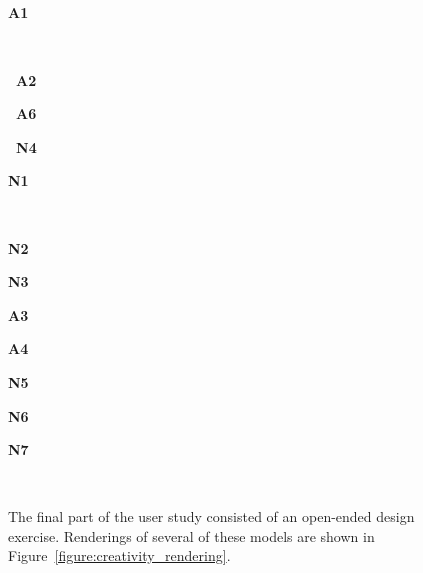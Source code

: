\begin{figure}[t]
\vspace{-2.35in}
\\
\begin{minipage}{1.97in}~\end{minipage}
\begin{minipage}{1.97in}~\end{minipage}
\begin{minipage}{1.97in}~\end{minipage}
\begin{minipage}{0.88in}{\bf A1}\end{minipage}
\vspace{0.85in}
\\
\begin{minipage}{1.97in}{\bf ~A2}\end{minipage}
\begin{minipage}{1.97in}{\bf ~A6}\end{minipage}
\begin{minipage}{1.97in}{\bf ~N4}\end{minipage}
\begin{minipage}{0.88in}{\bf N1}\end{minipage}
\vspace{0.85in}
\\
\begin{minipage}{0.97in}{\bf N2}\end{minipage}
\begin{minipage}{0.97in}{\bf N3}\end{minipage}
\begin{minipage}{0.97in}{\bf A3}\end{minipage}
\begin{minipage}{0.97in}{\bf A4}\end{minipage}
\begin{minipage}{0.97in}{\bf N5}\end{minipage}
\begin{minipage}{0.97in}{\bf N6}\end{minipage}
\begin{minipage}{0.97in}{\bf N7}\end{minipage}\vspace{-0.1in}
\\
  \caption{The final part of the user study consisted of an open-ended
    design exercise.  Renderings of several of these models are shown in Figure~\ref{figure:creativity_rendering}.}
\vspace{-0.1in}
\label{figure:new_designs}
\end{figure}
